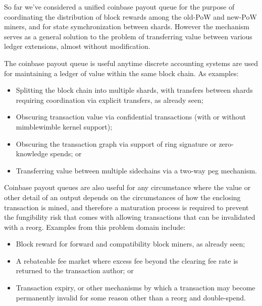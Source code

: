 So far we've considered a unified coinbase payout queue for the
purpose of coordinating the distribution of block rewards among the
old-PoW and new-PoW miners, and for state symchronization between
shards.  However the mechanism serves as a general solution to the
problem of transferring value between various ledger extensions,
almost without modification.

The coinbase payout queue is useful anytime discrete accounting
systems are used for maintaining a ledger of value within the same
block chain.  As examples:

\begin{itemize}

  \item

    Splitting the block chain into multiple shards, with transfers
    between shards requiring coordination via explicit transfers, as
    already seen;

  \item

    Obscuring transaction value via confidential transactions (with or
    without mimblewimble kernel support);

  \item

    Obscuring the transaction graph via support of ring signature or
    zero-knowledge spends; or

  \item

    Transferring value between multiple sidechains via a two-way peg
    mechanism.

\end{itemize}

Coinbase payout queues are also useful for any circumstance where the
value or other detail of an output depends on the circumstances of how
the enclosing transaction is mined, and therefore a maturation process
is required to prevent the fungibility risk that comes with allowing
transactions that can be invalidated with a reorg.  Examples from this
problem domain include:

\begin{itemize}

  \item

    Block reward for forward and compatibility block miners, as
    already seen;

  \item

    A rebateable fee market where excess fee beyond the clearing fee
    rate is returned to the transaction author; or

  \item

    Transaction expiry, or other mechanisms by which a transaction may
    become permanently invalid for some reason other than a reorg and
    double-spend.

\end{itemize}

